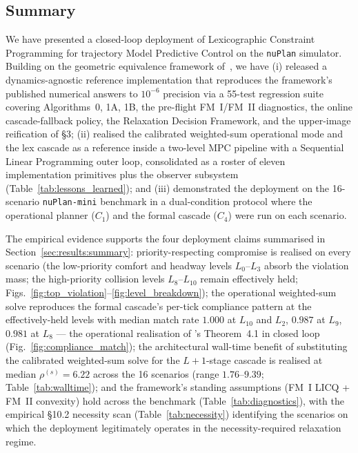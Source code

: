 
\subsection{Summary}
\label{sec:conclusion:summary}

We have presented a closed-loop deployment of Lexicographic Constraint Programming for trajectory Model Predictive Control on the \texttt{nuPlan} simulator. Building on the geometric equivalence framework of~\cite{lcp2025}, we have (i) released a dynamics-agnostic reference implementation that reproduces the framework's published numerical answers to $10^{-6}$ precision via a 55-test regression suite covering Algorithms~0, 1A, 1B, the pre-flight FM~I/FM~II diagnostics, the online cascade-fallback policy, the Relaxation Decision Framework, and the upper-image reification of \cite{lcp2025} \S3; (ii) realised the calibrated weighted-sum operational mode and the lex cascade as a reference inside a two-level MPC pipeline with a Sequential Linear Programming outer loop, consolidated as a roster of eleven implementation primitives plus the observer subsystem (Table~\ref{tab:lessons_learned}); and (iii) demonstrated the deployment on the 16-scenario \texttt{nuPlan-mini} benchmark in a dual-condition protocol where the operational planner ($C_1$) and the formal cascade ($C_4$) were run on each scenario.

The empirical evidence supports the four deployment claims summarised in Section~\ref{sec:results:summary}: priority-respecting compromise is realised on every scenario (the low-priority comfort and headway levels $L_0$--$L_3$ absorb the violation mass; the high-priority collision levels $L_8$--$L_{10}$ remain effectively held; Figs.~\ref{fig:top_violation}--\ref{fig:level_breakdown}); the operational weighted-sum solve reproduces the formal cascade's per-tick compliance pattern at the effectively-held levels with median match rate $1.000$ at $L_{10}$ and $L_2$, $0.987$ at $L_9$, $0.981$ at $L_8$ --- the operational realisation of \cite{lcp2025}'s Theorem~4.1 in closed loop (Fig.~\ref{fig:compliance_match}); the architectural wall-time benefit of substituting the calibrated weighted-sum solve for the $L{+}1$-stage cascade is realised at median $\rho^{(s)} = 6.22$ across the 16 scenarios (range $1.76$--$9.39$; Table~\ref{tab:walltime}); and the framework's standing assumptions (FM~I LICQ + FM~II convexity) hold across the benchmark (Table~\ref{tab:diagnostics}), with the empirical \S10.2 necessity scan (Table~\ref{tab:necessity}) identifying the scenarios on which the deployment legitimately operates in the necessity-required relaxation regime.

